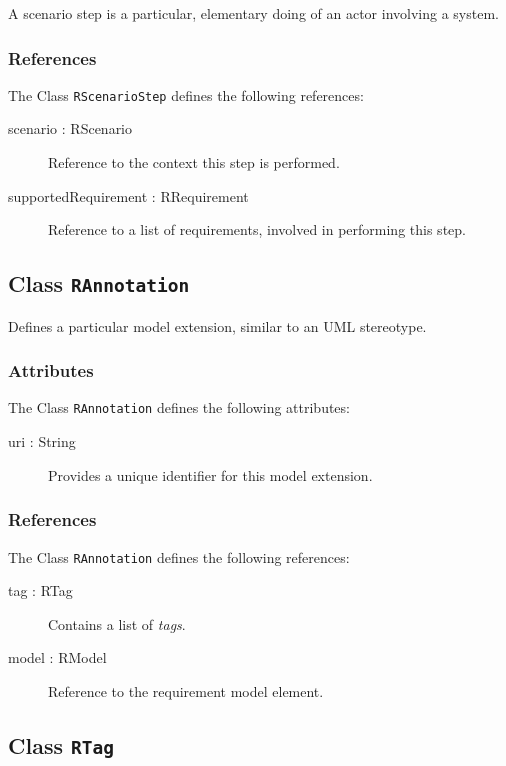 A scenario step is a particular, elementary doing of an actor involving a system.

\subsubsection{References}

The Class \verb|RScenarioStep| defines the following references:

\begin{description}
	\item[scenario : RScenario] Reference to the context this step is performed.
	\item[supportedRequirement : RRequirement] Reference to a list of requirements, involved in performing this step.
\end{description}

\subsection{Class {\tt RAnnotation}}

Defines a particular model extension, similar to an UML stereotype.

\subsubsection{Attributes}

The Class \verb|RAnnotation| defines the following attributes:

\begin{description}
	\item[uri : String] Provides a unique identifier for this model extension.
\end{description}
\subsubsection{References}

The Class \verb|RAnnotation| defines the following references:

\begin{description}
	\item[tag : RTag] Contains a list of \emph{tags}.
	\item[model : RModel] Reference to the requirement model element.
\end{description}

\subsection{Class {\tt RTag}}

